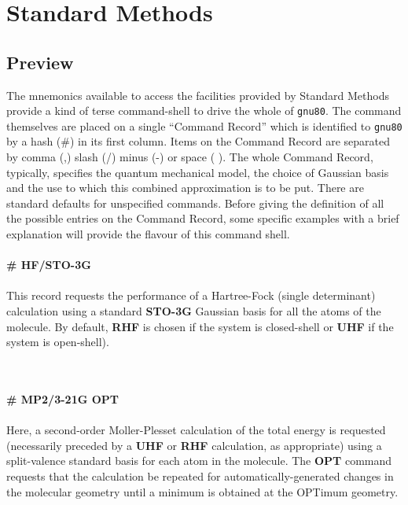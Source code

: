 \chapter{\sf Standard Methods}
\label{chap2}
\section{\sf Preview}
The mnemonics available to access the facilities provided
by Standard Methods provide a kind of terse command-shell to
drive the whole of {\tt gnu80}.
The command themselves are placed on a 
single ``Command Record'' 
which is identified to {\tt gnu80} by a hash (\#)
in its first column. Items on the Command Record 
are separated by comma (,)
slash (/) minus (-) or space ( ).
The whole Command Record, typically, specifies the quantum mechanical
model, the choice of Gaussian basis and the use to which
this combined approximation is to be put. 
There are standard 
defaults for unspecified commands.
Before giving the definition of all the possible entries on
the Command Record, some specific examples with a brief
explanation will provide the flavour of this
command shell.
\\
\vspace{0.5cm}
\\
{\bf \# HF/STO-3G}
\\
\vspace{0.5cm}
\\
This record requests the performance of a Hartree-Fock (single
determinant) calculation using a standard {\bf STO-3G} Gaussian basis for
all the atoms of the molecule. 
By default, {\bf RHF} is chosen if the system is closed-shell or
{\bf UHF} if the system is open-shell).

\begin{center}
\end{center}
\ \\
\vspace{0.5cm}
\\
{\bf \# MP2/3-21G OPT}
\\
\vspace{0.5cm}
\\
Here, a second-order Moller-Plesset calculation of the
total energy is requested (necessarily preceded by a {\bf UHF} or {\bf RHF}
calculation, as appropriate) using a split-valence standard
basis for each atom in the molecule. The {\bf OPT} command
requests that the calculation be repeated for automatically-generated
changes in the molecular geometry until a minimum is obtained at
the OPTimum geometry.

